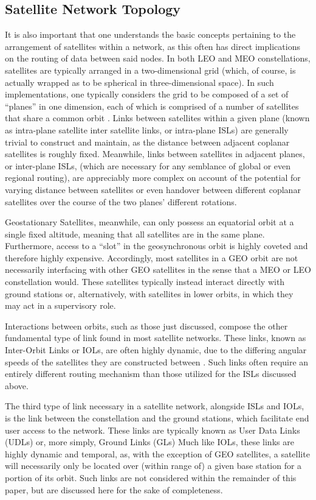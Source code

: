 \subsection{Satellite Network Topology}\label{subsec:satelliteNetworkTopology}
It is also important that one understands the basic concepts pertaining to the arrangement of satellites within a network, as this often has direct implications on the routing of data between said nodes. In both LEO and MEO constellations, satellites are typically arranged in a two-dimensional grid (which, of course, is actually wrapped as to be spherical in three-dimensional space). In such implementations, one typically considers the grid to be composed of a set of ``planes'' in one dimension, each of which is comprised of a number of satellites that share a common orbit \cite{xiaogang_survey_2016}. Links between satellites within a given plane (known as intra-plane satellite inter satellite links, or intra-plane ISLs) are generally trivial to construct and maintain, as the distance between adjacent coplanar satellites is roughly fixed. Meanwhile, links between satellites in adjacent planes, or inter-plane ISLs, (which are necessary for any semblance of global or even regional routing), are appreciably more complex on account of the potential for varying distance between satellites or even handover between different coplanar satellites over the course of the two planes' different rotations.

Geostationary Satellites, meanwhile, can only possess an equatorial orbit at a single fixed altitude, meaning that all satellites are in the same plane. Furthermore, access to a ``slot'' in the geosynchronous orbit is highly coveted and therefore highly expensive. Accordingly, most satellites in a GEO orbit are not necessarily interfacing with other GEO satellites in the sense that a MEO or LEO constellation would. These satellites typically instead interact directly with ground stations or, alternatively, with satellites in lower orbits, in which they may act in a supervisory role.

Interactions between orbits, such as those just discussed, compose the other fundamental type of link found in most satellite networks. These links, known as Inter-Orbit Links or IOLs, are often highly dynamic, due to the differing angular speeds of the satellites they are constructed between \cite{xiaogang_survey_2016}. Such links often require an entirely different routing mechanism than those utilized for the ISLs discussed above.

The third type of link necessary in a satellite network, alongside ISLs and IOLs, is the link between the constellation and the ground stations, which facilitate end user access to the network. These links are typically known as User Data Links (UDLs) or, more simply, Ground Links (GLs) \cite{xiaogang_survey_2016} Much like IOLs, these links are highly dynamic and temporal, as, with the exception of GEO satellites, a satellite will necessarily only be located over (within range of) a given base station for a portion of its orbit. Such links are not considered within the remainder of this paper, but are discussed here for the sake of completeness.